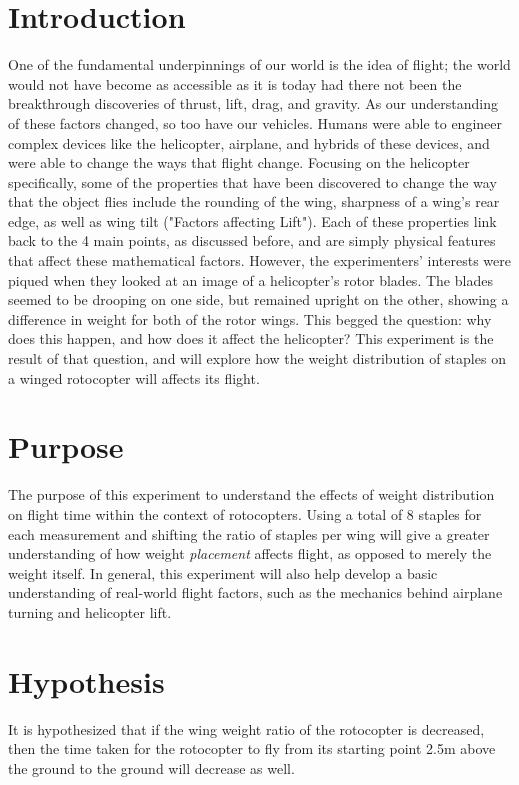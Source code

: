 \documentclass[]{article}
\theoremstyle{definition}
\begin{document}
\section{Introduction}
One of the fundamental underpinnings of our world is the idea of flight; the world would not have become as accessible as it is today had there not been the breakthrough discoveries of thrust, lift, drag, and gravity. As our understanding of these factors changed, so too have our vehicles. Humans were able to engineer complex devices like the helicopter, airplane, and hybrids of these devices, and were able to change the ways that flight change. Focusing on the helicopter specifically, some of the properties that have been discovered to change the way that the object flies include the rounding of the wing, sharpness of a wing's rear edge, as well as wing tilt ("Factors affecting Lift"). Each of these properties link back to the 4 main points, as discussed before, and are simply physical features that affect these mathematical factors. However, the experimenters' interests were piqued when they looked at an image of a helicopter's rotor blades. The blades seemed to be drooping on one side, but remained upright on the other, showing a difference in weight for both of the rotor wings. This begged the question: why does this happen, and how does it affect the helicopter? This experiment is the result of that question, and will explore how the weight distribution of staples on a winged rotocopter will affects its flight.

\section{Purpose}
The purpose of this experiment to understand the effects of weight distribution on flight time within the context of rotocopters. Using a total of 8 staples for each measurement and shifting the ratio of staples per wing will give a greater understanding of how weight \textit{placement} affects flight, as opposed to merely the weight itself. In general, this experiment will also help develop a basic understanding of real-world flight factors, such as the mechanics behind airplane turning and helicopter lift.

\section{Hypothesis}
It is hypothesized that if the wing weight ratio of the rotocopter is decreased, then the time taken for the rotocopter to fly from its starting point 2.5m above the ground to the ground will decrease as well. 
\end{document}
